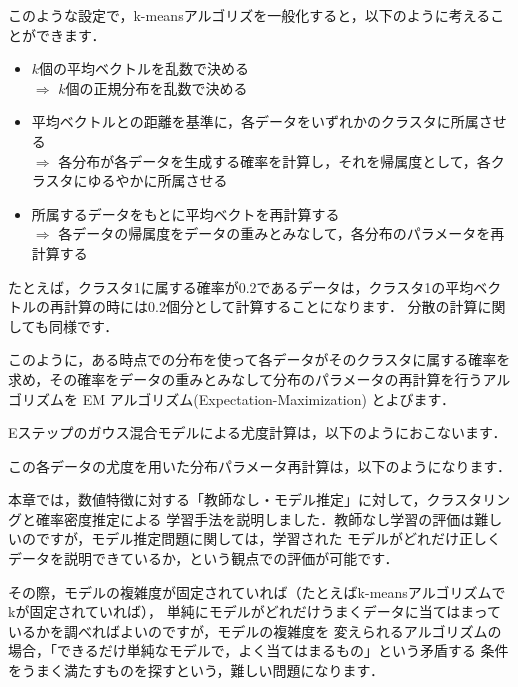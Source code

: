 
このような設定で，k-meansアルゴリズを一般化すると，以下のように考えることができます．

\begin{itemize}
\item $k$個の平均ベクトルを乱数で決める\\
 $\Rightarrow$ $k$個の正規分布を乱数で決める
\item 平均ベクトルとの距離を基準に，各データをいずれかのクラスタに所属させる\\
 $\Rightarrow$ 各分布が各データを生成する確率を計算し，それを帰属度として，各クラスタにゆるやかに所属させる
\item 所属するデータをもとに平均ベクトを再計算する\\
 $\Rightarrow$ 各データの帰属度をデータの重みとみなして，各分布のパラメータを再計算する
\end{itemize}

たとえば，クラスタ1に属する確率が0.2であるデータは，クラスタ1の平均ベクトルの再計算の時には0.2個分として計算することになります．
分散の計算に関しても同様です．


このように，ある時点での分布を使って各データがそのクラスタに属する確率を求め，その確率をデータの重みとみなして分布のパラメータの再計算を行うアルゴリズムを
EM アルゴリズム(Expectation-Maximization)
とよびます．


Eステップのガウス混合モデルによる尤度計算は，以下のようにおこないます．

この各データの尤度を用いた分布パラメータ再計算は，以下のようになります．

本章では，数値特徴に対する「教師なし・モデル推定」に対して，クラスタリングと確率密度推定による
学習手法を説明しました．教師なし学習の評価は難しいのですが，モデル推定問題に関しては，学習された
モデルがどれだけ正しくデータを説明できているか，という観点での評価が可能です．

その際，モデルの複雑度が固定されていれば（たとえばk-meansアルゴリズムでkが固定されていれば），
単純にモデルがどれだけうまくデータに当てはまっているかを調べればよいのですが，モデルの複雑度を
変えられるアルゴリズムの場合，「できるだけ単純なモデルで，よく当てはまるもの」という矛盾する
条件をうまく満たすものを探すという，難しい問題になります．

